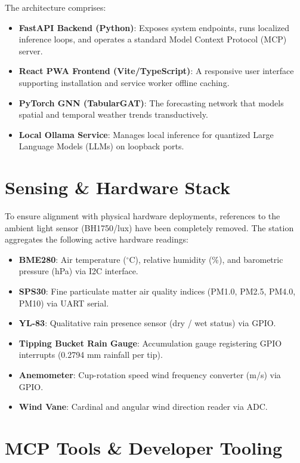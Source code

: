 \documentclass[12pt]{article}
\begin{document}
The architecture comprises:
\begin{itemize}
    \item \textbf{FastAPI Backend (Python)}: Exposes system endpoints, runs localized inference loops, and operates a standard Model Context Protocol (MCP) server.
    \item \textbf{React PWA Frontend (Vite/TypeScript)}: A responsive user interface supporting installation and service worker offline caching.
    \item \textbf{PyTorch GNN (TabularGAT)}: The forecasting network that models spatial and temporal weather trends transductively.
    \item \textbf{Local Ollama Service}: Manages local inference for quantized Large Language Models (LLMs) on loopback ports.
\end{itemize}

\section{Sensing \& Hardware Stack}
To ensure alignment with physical hardware deployments, references to the ambient light sensor (BH1750/lux) have been completely removed. The station aggregates the following active hardware readings:
\begin{itemize}
    \item \textbf{BME280}: Air temperature ($^{\circ}$C), relative humidity (\%), and barometric pressure (hPa) via I2C interface.
    \item \textbf{SPS30}: Fine particulate matter air quality indices (PM1.0, PM2.5, PM4.0, PM10) via UART serial.
    \item \textbf{YL-83}: Qualitative rain presence sensor (dry / wet status) via GPIO.
    \item \textbf{Tipping Bucket Rain Gauge}: Accumulation gauge registering GPIO interrupts (0.2794 mm rainfall per tip).
    \item \textbf{Anemometer}: Cup-rotation speed wind frequency converter (m/s) via GPIO.
    \item \textbf{Wind Vane}: Cardinal and angular wind direction reader via ADC.
\end{itemize}

\section{MCP Tools \& Developer Tooling}
\end{document}
